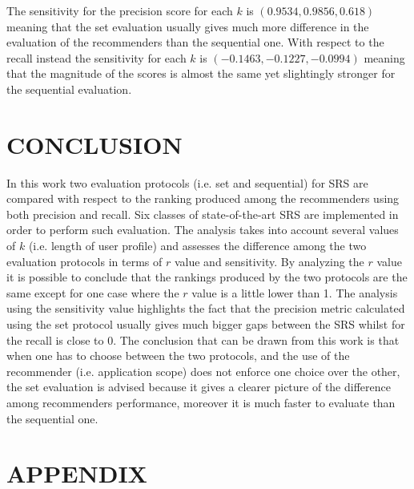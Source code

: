 \documentclass[prodmode,acmtecs]{acmsmall} %
\begin{document}
The sensitivity for the precision score for each $k$ is $(0.9534,  0.9856,  0.618)$ meaning that the set evaluation usually gives much more difference in the evaluation of the recommenders than the sequential one. With respect to the recall instead the sensitivity for each $k$ is $(-0.1463, -0.1227, -0.0994)$ meaning that the magnitude of the scores is almost the same yet slightingly stronger for the sequential evaluation.

\section{CONCLUSION}
In this work two evaluation protocols (i.e. set and sequential) for SRS are compared with respect to the ranking produced among the recommenders using both precision and recall. Six classes of state-of-the-art SRS are implemented in order to perform such evaluation. The analysis takes into account several values of $k$ (i.e. length of user profile) and assesses the difference among the two evaluation protocols in terms of $r$ value and sensitivity. By analyzing the $r$ value it is possible to conclude that the rankings produced by the two protocols are the same except for one case where the $r$ value is a little lower than 1. The analysis using the sensitivity value highlights the fact that the precision metric calculated using the set protocol usually gives much bigger gaps between the SRS whilst for the recall is close to 0. The conclusion that can be drawn from this work is that when one has to choose between the two protocols, and the use of the recommender (i.e. application scope) does not enforce one choice over the other, the set evaluation is advised because it gives a clearer picture of the difference among recommenders performance, moreover it is much faster to evaluate than the sequential one.

\newpage
\section{APPENDIX}
\end{document}
